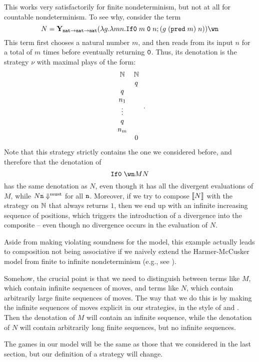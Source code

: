 \documentclass[sigplan,10pt,review]{acmart}\settopmatter{printfolios=true,printccs=false,printacmref=false}
\begin{document}
This works very satisfactorily for finite nondeterminism, but not at all for countable nondeterminism.  
To see why, consider the term
\[
  N = \Y_{\nat\to\nat\to\nat}(\lambda g.\lambda m n.\IfO m\;\0\;n;(g\;(\pred m)\;n))\wn
  \]
This term first chooses a natural number $m$, and then reads from its input $n$ for a total of $m$ times before eventually returning ${\mathtt{0}}$.  
Thus, its denotation is the strategy $\nu$ with maximal plays of the form:
\[
  \begin{array}{cc}
    \mathbf{\mathbb{N}} & \mathbf{\mathbb{N}} \\
    & q \\
    q & \\
    n_1 & \\
    \vdots & \\
    q & \\
    n_m & \\
    & 0
  \end{array}\,.
  \]
Note that this strategy strictly contains the one we considered before, and therefore that the denotation of
\[
  \IfO \wn M N
  \]
has the same denotation as $N$, even though it has all the divergent evaluations of $M$, while $N{\mathtt{n}}\Downarrow^{\text{must}}$ for all ${\mathtt{n}}$.
Moreover, if we try to compose $\left\llbracket N\right\rrbracket$ with the strategy on $\mathbb{N}$ that always returns $1$, then we end up with an infinite increasing sequence of positions, which triggers the introduction of a divergence into the composite -- even though no divergence occurs in the evaluation of $N$.

Aside from making violating soundness for the model, this example actually leads to composition not being associative if we naively extend the Harmer-McCusker model from finite to infinite nondeterminism (e.g., see \cite[4.4.1]{RusssThesis}).  

Somehow, the crucial point is that we need to distinguish between terms like $M$, which contain infinite sequences of moves, and terms like $N$, which contain arbitrarily large finite sequences of moves.  
The way that we do this is by making the infinite sequences of moves explicit in our strategies, in the style of \cite{RoscoeCspInfinite} and \cite{LevyGsInfinite}.  
Then the denotation of $M$ will contain an infinite sequence, while the denotation of $N$ will contain arbitrarily long finite sequences, but no infinite sequences.  

The games in our model will be the same as those that we considered in the last section, but our definition of a strategy will change.
\end{document}
